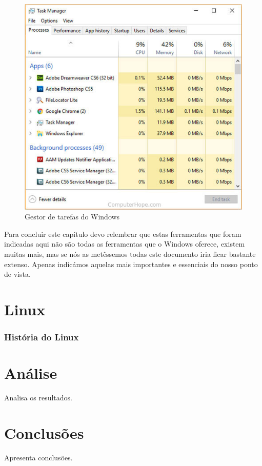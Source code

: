 \documentclass{report}
\begin{document}
\begin{figure}[h!]
\includegraphics[width=1\textwidth]{taskmana10.jpg}
\centering
\caption{Gestor de tarefas do Windows}
\end{figure}

Para concluir este capítulo devo relembrar que estas ferramentas que foram indicadas aqui não são todas as ferramentas que o Windows oferece, existem muitas mais, mas se nós as metêssemos todas este documento iria ficar bastante extenso. 
Apenas indicámos aquelas mais importantes e essenciais do nosso ponto de vista.


\chapter{Linux}
\label{chap.linux}

\subsection{História do Linux}





\chapter{Análise}
\label{chap.analise}
Analisa os resultados.

\chapter{Conclusões}
\label{chap.conclusao}
Apresenta conclusões.
\end{document}
